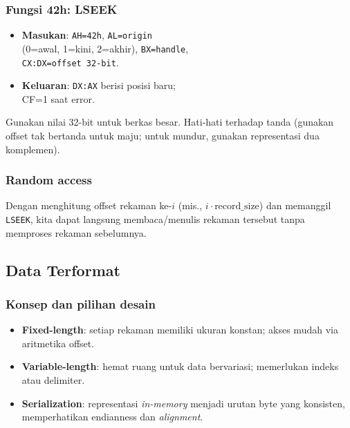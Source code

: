 \documentclass[../main.tex]{subfiles}
\begin{document}
        \subsubsection{Fungsi 42h: LSEEK}
            \begin{itemize}
                \item \textbf{Masukan}: \texttt{AH=42h}, \texttt{AL=origin} \\
                (0=awal, 1=kini, 2=akhir), \texttt{BX=handle}, \\
                \texttt{CX:DX=offset 32-bit}.
                \item \textbf{Keluaran}: \texttt{DX:AX} berisi posisi baru; \\
                CF=1 saat error.
            \end{itemize}
            Gunakan nilai 32-bit untuk berkas besar. Hati-hati terhadap tanda (gunakan offset tak bertanda untuk maju; untuk mundur, gunakan representasi dua komplemen).

        \subsubsection{Random access}
            Dengan menghitung offset rekaman ke-\(i\) (mis., \(i \cdot \text{record\_size}\)) dan memanggil \texttt{LSEEK}, kita dapat langsung membaca/menulis rekaman tersebut tanpa memproses rekaman sebelumnya.

        \subsection{Data Terformat}
            \subsubsection{Konsep dan pilihan desain}
                \begin{itemize}
                    \item \textbf{Fixed-length}: setiap rekaman memiliki ukuran konstan; akses mudah via aritmetika offset.
                    \item \textbf{Variable-length}: hemat ruang untuk data bervariasi; memerlukan indeks atau delimiter.
                    \item \textbf{Serialization}: representasi \textit{in-memory} menjadi urutan byte yang konsisten, memperhatikan endianness dan \textit{alignment}.
                \end{itemize}
\end{document}
